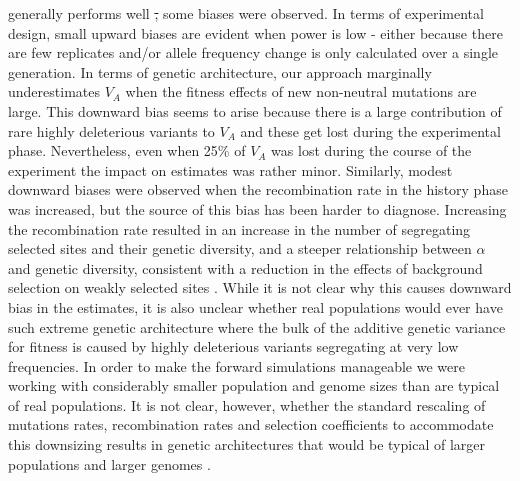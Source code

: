 \documentclass[12pt]{article}
\makeatletter
\providecommand{\DIFaddtex}[1]{{\protect\color{blue}\uwave{#1}}} %
\providecommand{\DIFdeltex}[1]{{\protect\color{red}\sout{#1}}} %
\providecommand{\DIFaddbegin}{} %
\providecommand{\DIFaddend}{} %
\providecommand{\DIFdelbegin}{} %
\providecommand{\DIFdelend}{} %
\providecommand{\DIFadd}[1]{\texorpdfstring{\DIFaddtex{#1}}{#1}} %
\providecommand{\DIFdel}[1]{\texorpdfstring{\DIFdeltex{#1}}{}} %
\newcommand{\DIFscaledelfig}{0.5}
\newlength{\DIFdelgraphicswidth} %
\newlength{\DIFdelgraphicsheight} %
\newcommand{\DIFaddincludegraphics}[2][]{{\color{blue}\fbox{\DIFOincludegraphics[#1]{#2}}}} %
\newcommand{\DIFdelincludegraphics}[2][]{%
\sbox{\DIFdelgraphicsbox}{\DIFOincludegraphics[#1]{#2}}%
\settoboxwidth{\DIFdelgraphicswidth}{\DIFdelgraphicsbox} %
\settoboxtotalheight{\DIFdelgraphicsheight}{\DIFdelgraphicsbox} %
\scalebox{\DIFscaledelfig}{%
\parbox[b]{\DIFdelgraphicswidth}{\usebox{\DIFdelgraphicsbox}\\[-\baselineskip] \rule{\DIFdelgraphicswidth}{0em}}\llap{\resizebox{\DIFdelgraphicswidth}{\DIFdelgraphicsheight}{%
\setlength{\unitlength}{\DIFdelgraphicswidth}%
\begin{picture}(1,1)%
\thicklines\linethickness{2pt} %
{\color[rgb]{1,0,0}\put(0,0){\framebox(1,1){}}}%
{\color[rgb]{1,0,0}\put(0,0){\line( 1,1){1}}}%
{\color[rgb]{1,0,0}\put(0,1){\line(1,-1){1}}}%
\end{picture}%
}\hspace*{3pt}}} %
} %
\DeclareRobustCommand{\DIFaddbegin}{\DIFOaddbegin \let\includegraphics\DIFaddincludegraphics} %
\DeclareRobustCommand{\DIFaddend}{\DIFOaddend \let\includegraphics\DIFOincludegraphics} %
\DeclareRobustCommand{\DIFdelbegin}{\DIFOdelbegin \let\includegraphics\DIFdelincludegraphics} %
\DeclareRobustCommand{\DIFdelend}{\DIFOaddend \let\includegraphics\DIFOincludegraphics} %
\let\sout@orig\sout %
\renewcommand{\sout}[1]{\ifmmode\text{\sout@orig{\ensuremath{#1}}}\else\sout@orig{#1}\fi} %
\makeatother
\begin{document}
\begin{bibunit}
\DIFadd{Our method }\DIFaddend generally performs well \DIFdelbegin \DIFdel{, }\DIFdelend \DIFaddbegin \DIFadd{in other respects, although }\DIFaddend some biases were observed. In terms of experimental design, small upward biases are evident when power is low - either because there are few replicates and/or allele frequency change is only calculated over a single generation. In terms of genetic architecture, our approach marginally underestimates $V_A$ when the fitness effects of new non-neutral mutations are large. This downward bias seems to arise because there is a large contribution of rare highly deleterious variants to $V_A$ and these get lost during the experimental phase. Nevertheless, even when 25\% of $V_A$ was lost during the course of the experiment the impact on estimates was rather minor.  Similarly, modest downward biases were observed when the recombination rate in the history phase was increased, but the source of this bias has been harder to diagnose. Increasing the recombination rate resulted in an increase in the number of segregating selected sites and their genetic diversity, and a steeper relationship between $\alpha$ and genetic diversity, consistent with a reduction in the effects of background selection \citep{charlesworth1993effect} on weakly selected sites \citep{stephan1999effect}.  While it is not clear why this causes downward bias in the estimates, it is also unclear whether real populations would ever have such extreme genetic architecture where the bulk of the additive genetic variance for fitness is caused by highly deleterious variants segregating at very low frequencies. In order to make the forward simulations manageable we were working with considerably smaller population and genome sizes than are typical of real populations. It is not clear, however, whether the standard rescaling of mutations rates, recombination rates and selection coefficients to accommodate this downsizing results in genetic architectures that would be typical of larger populations and larger genomes \citep{dabi2025population}. 


\end{bibunit}
\end{document}
